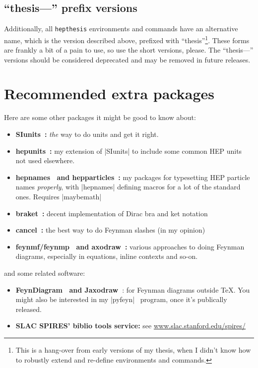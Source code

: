 \documentclass[12pt]{article}
\newcommand{\hepthesis}{\texttt{hepthesis}\xspace}
\let\OldCite\cite
\renewcommand{\cite}[1]{\mbox{\!\!\OldCite{#1}}}
\begin{document}
\subsection{``thesis---'' prefix versions}
Additionally, all \hepthesis environments and commands have an alternative name,
which is the version described above, prefixed with ``thesis''\footnote{This
  is a hang-over from early versions of my thesis, when I didn't know how to
  robustly extend and re-define environments and commands.}. These forms are
frankly a bit of a pain to use, so use the short versions, please. The
``thesis---'' versions should be considered deprecated and may be removed in
future releases.


\section{Recommended extra packages}
\label{sec:ExtraPackages}
Here are some other packages it might be good to know about:
\begin{itemize}
\item \textbf{SIunits~\cite{SIunits}:} \emph{the} way to do units and get it right.
\item \textbf{hepunits~\cite{hepunits}:} my extension of |SIunits| to include some common HEP units not used elsewhere.
\item \textbf{hepnames~\cite{hepnames} and hepparticles~\cite{hepparticles}:} my packages for typesetting HEP particle names \emph{properly}, with |hepnames| defining macros for a lot of the standard ones. Requires |maybemath|~\cite{maybemath}
\item \textbf{braket~\cite{braket}:} decent implementation of Dirac bra and ket notation
\item \textbf{cancel~\cite{cancel}:} the best way to do Feynman slashes (in my opinion)
\item \textbf{feynmf/feynmp~\cite{feynmf} and axodraw~\cite{axodraw}:} various approaches to doing Feynman diagrams, especially in equations, inline contexts and so-on.
\end{itemize}
%
and some related software:
%
\begin{itemize}
\item \textbf{FeynDiagram~\cite{feyndiagram} and Jaxodraw~\cite{jaxodraw}}: for Feynman diagrams outside \TeX. You might also
  be interested in my |pyfeyn|~\cite{pyfeyn} program, once it's publically released.
\item \textbf{SLAC SPIRES' biblio tools service:} see \url{www.slac.stanford.edu/spires/}
\end{itemize}
\end{document}
